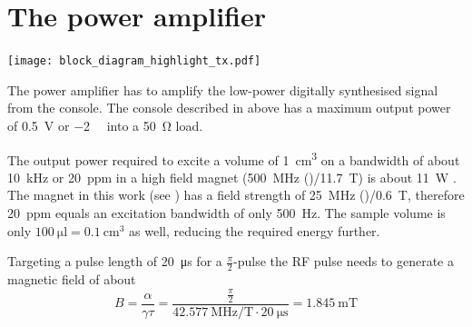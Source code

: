 
\section{The power amplifier}
\begin{marginfigure}
    \texttt{[image: block\_diagram\_highlight\_tx.pdf]}
\end{marginfigure}

The power amplifier has to amplify the low-power digitally synthesised signal from the console. The console described in  above has a maximum output power of \qty{0.5}{\volt} or \qty{-2}{\deci\belm} into a \qty{50}{\ohm} load.

The output power required to excite a volume of \qty{1}{\centi\meter\cubed} on a bandwidth of about \qty{10}{\kilo\hertz} or \qty{20}{ppm} in a high field magnet (\qty{500}{\mega\hertz} ()/\qty{11.7}{\tesla}) is about \qty{11}{\watt} . The magnet in this work (see ) has a field strength of \qty{25}{\mega\hertz} ()/\qty{0.6}{\tesla}, therefore \qty{20}{ppm} equals an excitation bandwidth of only \qty{500}{\hertz}. The sample volume is only \(\qty{100}{\micro\litre} = \qty{0.1}{\centi\meter\cubed}\) as well, reducing the required energy further.

Targeting a pulse length of \qty{20}{\micro\second} for a  \(\frac{\pi}{2}\)-pulse the RF pulse needs to generate a magnetic field of about
\[
    B = \frac{\alpha}{\gamma\tau} = \frac{\frac{\pi}{2}}{\qty{42.577}{\mega\hertz\per\tesla}\cdot{}\qty{20}{\micro\second}} = \qty{1.845}{\milli\tesla}
\]

